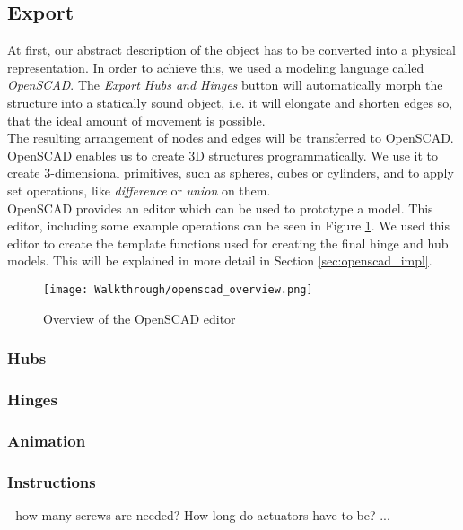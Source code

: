 \subsection{Export}
At first, our abstract description of the object has to be converted into a physical representation. In order to achieve this, we used a modeling language called \textit{OpenSCAD}. The \textit{Export Hubs and Hinges} button will automatically morph the structure into a statically sound object, i.e. it will elongate and shorten edges so, that the ideal amount of movement is possible. \\
The resulting arrangement of nodes and edges will be transferred to OpenSCAD. OpenSCAD enables us to create 3D structures programmatically. We use it to create 3-dimensional primitives, such as spheres, cubes or cylinders, and to apply set operations, like \textit{difference} or \textit{union} on them.\\
OpenSCAD provides an editor which can be used to prototype a model. This editor, including some example operations can be seen in Figure \ref{fig:openscad_overview}. We used this editor to create the template functions used for creating the final hinge and hub models. This will be explained in more detail in Section \ref{sec:openscad_impl}.
\begin{figure}[h!]
    \texttt{[image: Walkthrough/openscad\_overview.png]}
    \centering
    \caption{Overview of the OpenSCAD editor}
    \label{fig:openscad_overview}
\end{figure}

\subsubsection{Hubs}

\subsubsection{Hinges}

\subsubsection{Animation}

\subsubsection{Instructions}
- how many screws are needed? How long do actuators have to be? ...

